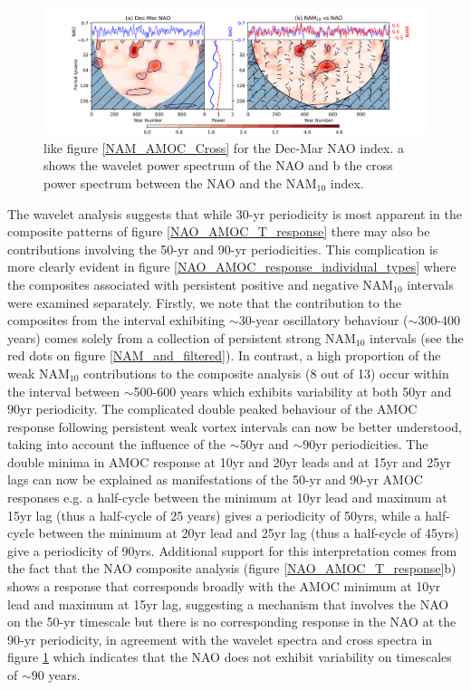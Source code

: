 \begin{figure}[h!]
\begin{center}
\noindent\includegraphics[width = \linewidth]{Figures/Figures-surface/NAM_NAO_filtered_subplot.png}
\caption[Wavelet power spectrum of the NAO and cross spectrum with the NAM$_{10}$ index]{like figure \ref{NAM_AMOC_Cross} for the Dec-Mar NAO index. a shows the wavelet power spectrum of the NAO and b the cross power spectrum between the NAO and the NAM$_{10}$ index.}
\label{NAO_NAM_Cross}
\end{center}
\end{figure}

The wavelet analysis suggests that while 30-yr periodicity is most apparent in the composite patterns of figure \ref{NAO_AMOC_T_response} there may also be contributions involving the 50-yr and 90-yr periodicities. This complication is more clearly evident in figure \ref{NAO_AMOC_response_individual_types} where the composites associated with persistent positive and negative NAM$_{10}$ intervals were examined separately. Firstly, we note that the contribution to the composites from the interval exhibiting $\sim$30-year oscillatory behaviour ($\sim$300-400 years) comes solely from a collection of persistent strong NAM$_{10}$ intervals (see the red dots on figure \ref{NAM_and_filtered}). In contrast, a high proportion of the weak NAM$_{10}$ contributions to the composite analysis (8 out of 13) occur within the interval between $\sim$500-600 years which exhibits variability at both 50yr and 90yr periodicity. The complicated double peaked behaviour of the AMOC response following persistent weak vortex intervals can now be better understood, taking into account the influence of the $\sim$50yr and $\sim$90yr periodicities. The double minima in AMOC response at 10yr and 20yr leads and at 15yr and 25yr lags can now be explained as manifestations of the 50-yr and 90-yr AMOC responses e.g. a half-cycle between the minimum at 10yr lead and maximum at 15yr lag (thus a half-cycle of 25 years) gives a periodicity of 50yrs, while a half-cycle between the minimum at 20yr lead and 25yr lag (thus a half-cycle of 45yrs) give a periodicity of 90yrs.  Additional support for this interpretation comes from the fact that the NAO composite analysis (figure \ref{NAO_AMOC_T_response}b) shows a response that corresponds broadly with the AMOC minimum at 10yr lead and maximum at 15yr lag, suggesting a mechanism that involves the NAO on the 50-yr timescale but there is no corresponding response in the NAO at the 90-yr periodicity, in agreement with  the wavelet spectra and cross spectra in figure \ref{NAO_NAM_Cross} which indicates that the NAO does not exhibit variability on timescales of $\sim$90 years. 

